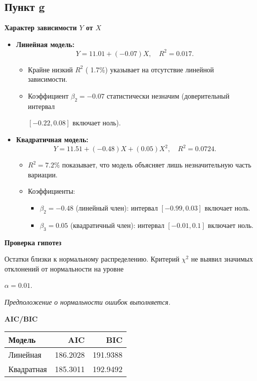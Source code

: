 \documentclass[12pt]{spbstu-task}
\begin{document}
\subsection{Пункт g}
\label{sec:org7a97cb4}
\textbf{Характер зависимости \(Y\) от \(X\)}
\begin{itemize}
\item \textbf{Линейная модель:} \[Y = 11.01 + (-0.07)X,\quad R^2 = 0.017.\]
\begin{itemize}
\item Крайне низкий \(R^2\) (
1.7\%) указывает на отсутствие линейной
зависимости.
\item Коэффициент \(\beta_2 = -0.07\) статистически незначим (доверительный интервал

\([-0.22, 0.08]\) включает ноль).
\end{itemize}
\item \textbf{Квадратичная модель:} \[Y = 11.51 + (-0.48)X + (0.05)X^2,\quad R^2 = 0.0724.\]
\begin{itemize}
\item \(R^2 = 7.2\%\) показывает,
что модель объясняет лишь незначительную часть вариации.
\item Коэффициенты:
\begin{itemize}
\item \(\beta_2 = -0.48\) (линейный
член): интервал 
\([-0.99, 0.03]\) включает ноль.
\item \(\beta_3 = 0.05\)
(квадратичный член): интервал 
\([-0.01, 0.1]\) включает ноль.
\end{itemize}
\end{itemize}
\end{itemize}

\textbf{Проверка гипотез}

Остатки близки к нормальному распределению.  Критерий \(\chi^2\) не
выявил значимых отклонений от нормальности на уровне

\(\alpha = 0.01\).

\emph{Предположение о нормальности ошибок выполняется.}

\textbf{AIC/BIC}
\begin{table}[H]
  \centering
  \begin{tabular}{lrr} \toprule
    Модель & AIC & BIC \\ \midrule
    Линейная & 186.2028 & 191.9388 \\
    Квадратная & 185.3011 & 192.9492 \\ \bottomrule
  \end{tabular}
\end{table}
\end{document}
